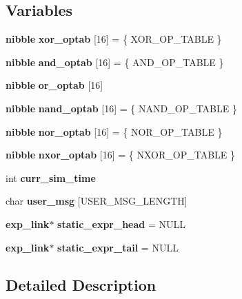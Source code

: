 \subsection*{Variables}
\begin{CompactItemize}
\item 
{\bf nibble} {\bf xor\_\-optab} [16] = \{ XOR\_\-OP\_\-TABLE \}
\item 
{\bf nibble} {\bf and\_\-optab} [16] = \{ AND\_\-OP\_\-TABLE \}
\item 
{\bf nibble} {\bf or\_\-optab} [16]
\item 
{\bf nibble} {\bf nand\_\-optab} [16] = \{ NAND\_\-OP\_\-TABLE \}
\item 
{\bf nibble} {\bf nor\_\-optab} [16] = \{ NOR\_\-OP\_\-TABLE \}
\item 
{\bf nibble} {\bf nxor\_\-optab} [16] = \{ NXOR\_\-OP\_\-TABLE \}
\item 
int {\bf curr\_\-sim\_\-time}
\item 
char {\bf user\_\-msg} [USER\_\-MSG\_\-LENGTH]
\item 
{\bf exp\_\-link}$\ast$ {\bf static\_\-expr\_\-head} = NULL
\item 
{\bf exp\_\-link}$\ast$ {\bf static\_\-expr\_\-tail} = NULL
\end{CompactItemize}


\subsection{Detailed Description}


